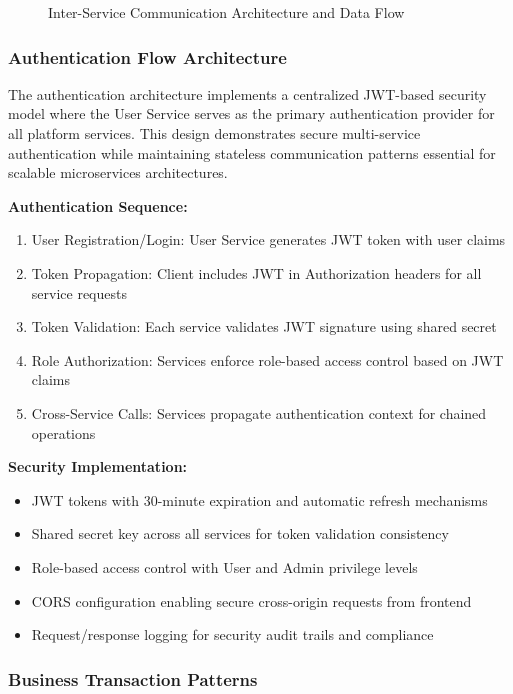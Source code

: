 \begin{figure}[H]
\centering
\caption{Inter-Service Communication Architecture and Data Flow}
\label{fig:service-communication-patterns}
\end{figure}

\subsubsection{Authentication Flow Architecture}

The authentication architecture implements a centralized JWT-based security model where the User Service serves as the primary authentication provider for all platform services. This design demonstrates secure multi-service authentication while maintaining stateless communication patterns essential for scalable microservices architectures.

\textbf{Authentication Sequence:}
\begin{enumerate}
\item User Registration/Login: User Service generates JWT token with user claims
\item Token Propagation: Client includes JWT in Authorization headers for all service requests
\item Token Validation: Each service validates JWT signature using shared secret
\item Role Authorization: Services enforce role-based access control based on JWT claims
\item Cross-Service Calls: Services propagate authentication context for chained operations
\end{enumerate}

\textbf{Security Implementation:}
\begin{itemize}
\item JWT tokens with 30-minute expiration and automatic refresh mechanisms
\item Shared secret key across all services for token validation consistency
\item Role-based access control with User and Admin privilege levels
\item CORS configuration enabling secure cross-origin requests from frontend
\item Request/response logging for security audit trails and compliance
\end{itemize}

\subsubsection{Business Transaction Patterns}

